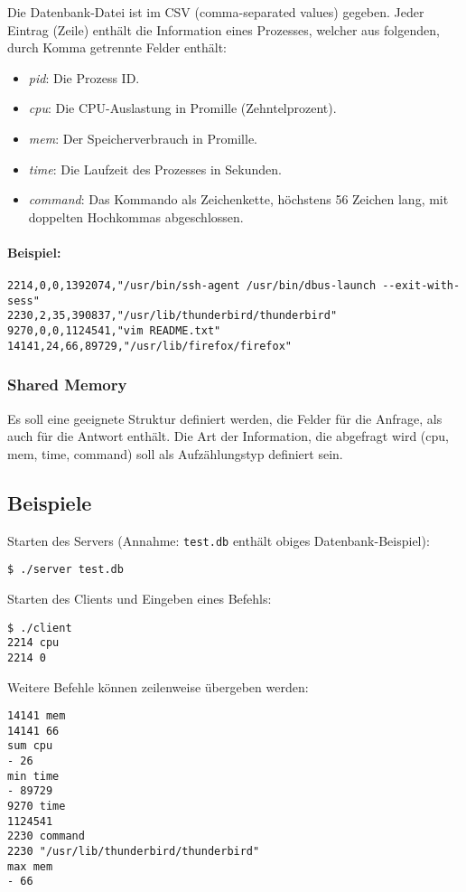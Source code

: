 Die Datenbank-Datei ist im CSV (comma-separated values) gegeben.
Jeder Eintrag (Zeile) enthält die Information eines Prozesses, welcher
aus folgenden, durch Komma getrennte Felder enthält:

\begin{itemize}
  \item \emph{pid}: Die Prozess ID.
  \item \emph{cpu}: Die CPU-Auslastung in Promille (Zehntelprozent).
  \item \emph{mem}: Der Speicherverbrauch in Promille.
  \item \emph{time}: Die Laufzeit des Prozesses in Sekunden.
  \item \emph{command}: Das Kommando als Zeichenkette, höchstens 56
    Zeichen lang, mit doppelten Hochkommas abgeschlossen.
\end{itemize}

\paragraph{Beispiel:}

\begin{verbatim}
2214,0,0,1392074,"/usr/bin/ssh-agent /usr/bin/dbus-launch --exit-with-sess"
2230,2,35,390837,"/usr/lib/thunderbird/thunderbird"
9270,0,0,1124541,"vim README.txt"
14141,24,66,89729,"/usr/lib/firefox/firefox"
\end{verbatim}



\subsubsection*{Shared Memory}

Es soll eine geeignete Struktur definiert werden, die Felder für die Anfrage,
als auch für die Antwort enthält. Die Art der Information, die abgefragt wird
(cpu, mem, time, command) soll als Aufzählungstyp definiert sein.


\subsection*{Beispiele}

Starten des Servers (Annahme: \texttt{test.db} enthält obiges
Datenbank-Beispiel):
%
\begin{verbatim}
$ ./server test.db
\end{verbatim}
%
Starten des Clients und Eingeben eines Befehls:
%
\begin{verbatim}
$ ./client
2214 cpu
2214 0
\end{verbatim}
%
Weitere Befehle können zeilenweise übergeben werden:
%
\begin{verbatim}
14141 mem
14141 66
sum cpu
- 26
min time
- 89729
9270 time
1124541
2230 command
2230 "/usr/lib/thunderbird/thunderbird"
max mem
- 66
\end{verbatim}

\osueguidelinesthree


